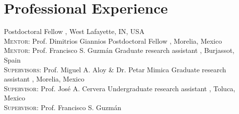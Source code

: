 \section{Professional Experience}

%
{\DPA}{Postdoctoral Fellow}%
{}%
{}%
{\Purdue, West Lafayette, IN, USA\\%
  \textsc{Mentor}: Prof. Dimitrios Giannios%
}
%
{\IFMes}{Postdoctoral Fellow}%
{}%
{}%
{\UMSNHes, Morelia, Mexico\\%
  \textsc{Mentor}: Prof. Francisco S. Guzmán%
}
%
{\DAAval}{Graduate research assistant}%
{}%
{}%
{\UVval, Burjassot, Spain\\%
  \textsc{Supervisors}: Prof. Miguel A. Aloy \& Dr. Petar Mimica%
}
%
{\IFMes}{Graduate research assistant}%
{}%
{}%
{\UMSNHes, Morelia, Mexico\\%
  \textsc{Supervisor}: Prof. José A. Cervera%
}
%
{\FCes}{Undergraduate research assistant}%
{}%
{}%
{\UAEMes, Toluca, Mexico\\%
  \textsc{Supervisor}: Prof. Francisco S. Guzmán
}
